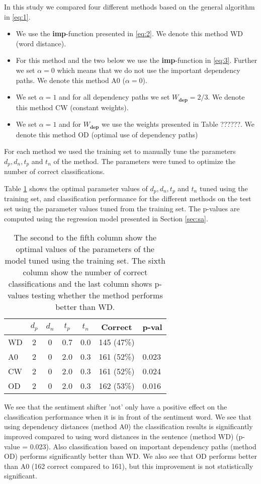 \documentclass[11pt]{article}
\begin{document}
In this study we compared four different methods based on the general algorithm in \eqref{eq:1}.
\begin{itemize}
\item We use the \textbf{imp}-function presented in \eqref{eq:2}. We denote this method WD (word distance).
\item For this method and the two below we use the \textbf{imp}-function in \eqref{eq:3}. Further we set $\alpha = 0$ which means that we do not use the important dependency paths. We denote this method A0 ($\alpha = 0$).
\item We set $\alpha = 1$ and for all dependency paths we set $W_{\mathbf{dep}} = 2/3$. We denote this method CW (constant weights).
\item We set $\alpha = 1$ and for $W_{\mathbf{dep}}$ we use the weights presented in Table ??????. We denote this method OD (optimal use of dependency paths)
\end{itemize}
For each method we used the training set to manually tune the parameters $d_p, d_n, t_p$ and $t_n$ of the method. The parameters were tuned to optimize the number of correct classifications.

Table \ref{tab:2} shows the optimal parameter values of $d_p, d_n, t_p$ and $t_n$ tuned using the training set, and classification performance for the different methods on the test set using the parameter values tuned from the training set. The p-values are computed using the regression model presented in Section \ref{sec:sa}.
\begin{table}
  \caption{The second to the fifth column show the optimal values of the parameters of the model tuned using the training set. The sixth column show the number of correct classifications and the last column shows p-values testing whether the method performs better than WD.}
  \centering
  \begin{tabular}{lcccccl}
       & $d_p$ & $d_n$ & $t_p$ & $t_n$ & Correct   & p-val \\ \hline
    WD &    2  &   0  & 0.7  &  0.0  & 145 (47\%) & \\
    A0 &    2  &   0  & 2.0  &  0.3  & 161 (52\%) & 0.023\\
    CW &    2  &   0  & 2.0  &  0.3  & 161 (52\%) & 0.024\\
    OD &    2  &   0  & 2.0  &  0.3  & 162 (53\%) & 0.016
  \end{tabular}
  \label{tab:2}
\end{table}
We see that the sentiment shifter 'not' only have a positive effect on the classification performance when it is in front of the sentiment word. We see that using dependency distances (method A0) the classification results is significantly improved compared to using word distances in the sentence (method WD) (p-value = 0.023). Also classification based on important dependency paths (method OD) performs significantly better than WD. We also see that OD performs better than A0 (162 correct compared to 161), but this improvement is not statistically significant. 
\end{document}

